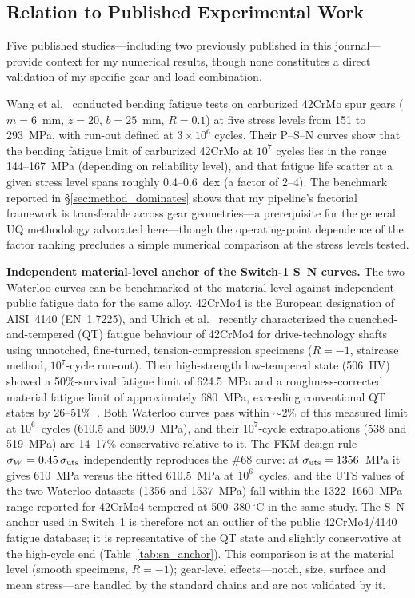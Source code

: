 \documentclass[twocolumn,12pt,a4paper]{article}
\begin{document}
\subsection{Relation to Published Experimental Work}
\label{sec:published}

Five published studies---including two previously published in
this journal---provide context for my numerical results, though
none constitutes a direct validation of my specific
gear-and-load combination.

Wang et al.~\cite{wang2023} conducted bending fatigue tests on
carburized 42CrMo spur gears ($m{=}6$~mm, $z{=}20$, $b{=}25$~mm,
$R{=}0.1$) at five stress levels from 151 to 293~MPa, with run-out
defined at $3\times10^6$ cycles. Their P--S--N curves show that the
bending fatigue limit of carburized 42CrMo at $10^7$ cycles lies in the
range 144--167~MPa (depending on reliability level), and that fatigue
life scatter at a given stress level spans roughly 0.4--0.6~dex (a
factor of 2--4). The
benchmark reported in \S\ref{sec:method_dominates} shows that
my pipeline's factorial framework is transferable across gear geometries---a
prerequisite for the general UQ methodology advocated here---though the
operating-point dependence of the factor ranking precludes a simple
numerical comparison at the stress levels tested.

\textbf{Independent material-level anchor of the Switch-1 S--N curves.}
The two Waterloo curves can be benchmarked at the material level
against independent public fatigue data for the same alloy.
42CrMo4 is the European designation of AISI~4140 (EN~1.7225), and
Ulrich et al.~\cite{ulrich2025} recently characterized the
quenched-and-tempered (QT) fatigue behaviour of 42CrMo4 for
drive-technology shafts using unnotched, fine-turned,
tension-compression specimens ($R=-1$, staircase method,
$10^7$-cycle run-out). Their high-strength low-tempered state
(506~HV) showed a 50\%-survival fatigue limit of 624.5~MPa and a
roughness-corrected material fatigue limit of approximately 680~MPa,
exceeding conventional QT states by 26--51\%~\cite{ulrich2025}. Both
Waterloo curves pass within $\sim$2\% of this measured limit at
$10^6$~cycles (610.5 and 609.9~MPa), and their $10^7$-cycle
extrapolations (538 and 519~MPa) are 14--17\% conservative relative
to it. The FKM design rule $\sigma_W = 0.45\,\sigma_{\rm uts}$
independently reproduces the \#68 curve: at
$\sigma_{\rm uts}=1356$~MPa it gives 610~MPa versus the fitted
610.5~MPa at $10^6$~cycles, and the UTS values of the two Waterloo
datasets (1356 and 1537~MPa) fall within the 1322--1660~MPa range
reported for 42CrMo4 tempered at 500--380\,$^\circ$C in the same
study. The S--N anchor used in Switch~1 is therefore not an outlier
of the public 42CrMo4/4140 fatigue database; it is representative of
the QT state and slightly conservative at the high-cycle end
(Table~\ref{tab:sn_anchor}). This comparison is at the material
level (smooth specimens, $R=-1$); gear-level effects---notch, size,
surface and mean stress---are handled by the standard chains and are
not validated by it.
\end{document}
